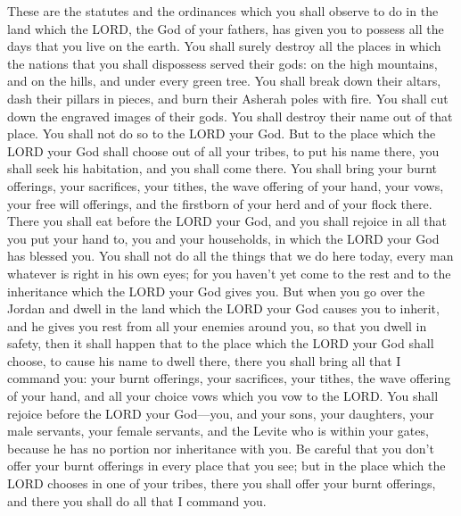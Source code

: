  These are the statutes and the ordinances which you shall
observe to do in the land which the LORD, the God of your fathers, has
given you to possess all the days that you live on the earth.
 You shall surely destroy all the places in which the
nations that you shall dispossess served their gods: on the high
mountains, and on the hills, and under every green tree. 
You shall break down their altars, dash their pillars in pieces, and
burn their Asherah poles with fire. You shall cut down the engraved
images of their gods. You shall destroy their name out of that place.
 You shall not do so to the LORD your God. 
But to the place which the LORD your God shall choose out of all your
tribes, to put his name there, you shall seek his habitation, and you
shall come there.  You shall bring your burnt offerings,
your sacrifices, your tithes, the wave offering of your hand, your vows,
your free will offerings, and the firstborn of your herd and of your
flock there.  There you shall eat before the LORD your
God, and you shall rejoice in all that you put your hand to, you and
your households, in which the LORD your God has blessed you.
 You shall not do all the things that we do here today,
every man whatever is right in his own eyes;  for you
haven't yet come to the rest and to the inheritance which the LORD your
God gives you.  But when you go over the Jordan and dwell
in the land which the LORD your God causes you to inherit, and he gives
you rest from all your enemies around you, so that you dwell in safety,
 then it shall happen that to the place which the LORD
your God shall choose, to cause his name to dwell there, there you shall
bring all that I command you: your burnt offerings, your sacrifices,
your tithes, the wave offering of your hand, and all your choice vows
which you vow to the LORD.  You shall rejoice before the
LORD your God---you, and your sons, your daughters, your male servants,
your female servants, and the Levite who is within your gates, because
he has no portion nor inheritance with you.  Be careful
that you don't offer your burnt offerings in every place that you see;
 but in the place which the LORD chooses in one of your
tribes, there you shall offer your burnt offerings, and there you shall
do all that I command you.

